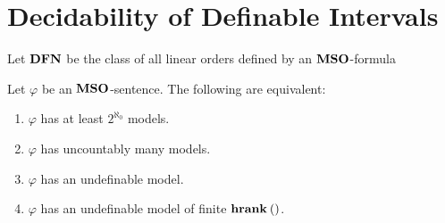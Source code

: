 \section{Decidability of Definable Intervals}

\begin{definition}
    Let $\mathbf{DFN}$ be the class of all linear orders defined
    by an $\mathbf{MSO}$-formula
\end{definition}


\begin{theorem}
    Let $\varphi$ be an $\mathbf{MSO}$-sentence. The following are equivalent:
    \begin{enumerate}
        \item $\varphi$ has at least $2^{\aleph_0}$ models.
        \item $\varphi$ has uncountably many models.
        \item $\varphi$ has an undefinable model.
        \item $\varphi$ has an undefinable model of finite $\mathbf{hrank}_{} \left( {} \right)$.
    \end{enumerate}
\end{theorem}

